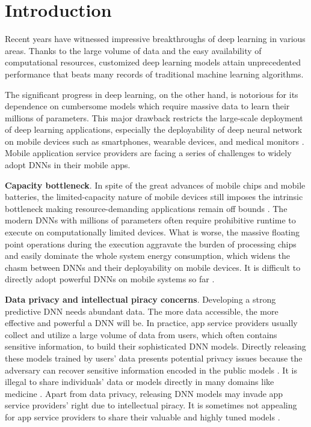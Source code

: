 \documentclass[letterpaper]{article} %
\begin{document}
\section{Introduction}
Recent years have witnessed impressive breakthroughs of deep learning in various areas. Thanks to the large volume of data and the easy availability of computational resources, customized deep learning models attain unprecedented performance that beats many records of traditional machine learning algorithms.

The significant progress in deep learning, on the other hand, is notorious for its dependence on cumbersome models which require massive data to learn their millions of parameters. This major drawback restricts the large-scale deployment of deep learning applications, especially the deployability of deep neural network on mobile devices such as smartphones, wearable devices, and medical monitors \cite{cao2017deepmood,li2016droidclassifier}. Mobile application service providers are facing a series of challenges to widely adopt DNNs in their mobile apps.

\textbf{Capacity bottleneck}. In spite of the great advances of mobile chips and mobile batteries, the limited-capacity nature of mobile devices still imposes the intrinsic bottleneck making resource-demanding applications remain off bounds \cite{wang2018not}. The modern DNNs with millions of parameters often require prohibitive runtime to execute on computationally limited devices. What is worse, the massive floating point operations during the execution aggravate the burden of processing chips and easily dominate the whole system energy consumption, which widens the chasm between DNNs and their deployability on mobile devices. It is difficult to directly adopt powerful DNNs on mobile systems so far \cite{lee2017technology}.

\textbf{Data privacy and intellectual piracy concerns}. Developing a strong predictive DNN needs abundant data. The more data accessible, the more effective and powerful a DNN will be. In practice, app service providers usually collect and utilize a large volume of data from users, which often contains sensitive information, to build their sophisticated DNN models. Directly releasing these models trained by users' data presents potential privacy issues because the adversary can recover sensitive information encoded in the public models \cite{hitaj2017deep,abadi2016deep}. It is illegal to share individuals' data or models directly in many domains like medicine \cite{hipaa2013}. Apart from data privacy, releasing DNN models may invade app service providers' right due to intellectual piracy. It is sometimes not appealing for app service providers to share their valuable and highly tuned models \cite{osia2017a}.
\end{document}
